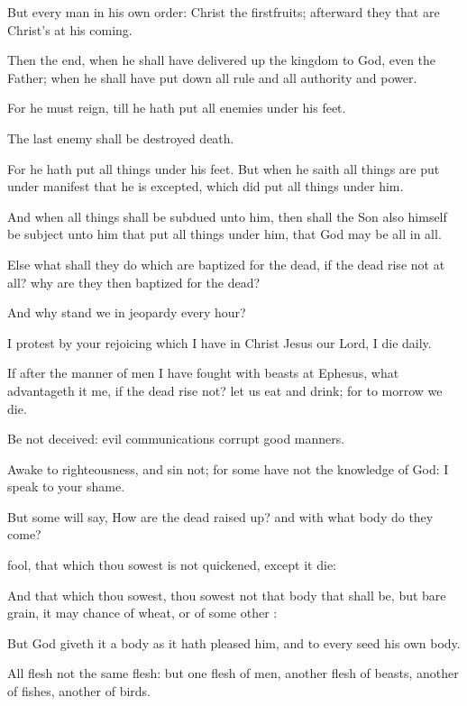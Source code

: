 {But every
man
in his
own
order:
Christ the
firstfruits;
afterward they that
are
Christ’s
at
his
coming.

Then
{} the
end,
when he shall have delivered
up the
kingdom to
God,
even the
Father;
when he shall have put
down
all
rule
and
all
authority
and
power.

For
he
must
reign,
till
he hath
put
all
enemies
under
his
feet.

The
last
enemy
{} shall be
destroyed
{}
death.

For he hath
put all
things
under
his
feet.
But
when he
saith all
things are put
under
{}
manifest
that he is
excepted,
which did
put all
things
under
him.

And
when all
things shall be
subdued unto
him,
then
shall the
Son
also
himself be
subject unto
him that
put all
things under
him,
that
God may
be
all
in
all.

Else
what shall they
do
which are
baptized
for the
dead,
if the
dead
rise
not at
all?
why are
they
then
baptized
for the
dead?

And
why
stand
we in
jeopardy
every
hour?

I protest
by
your
rejoicing
which I
have
in
Christ
Jesus
our
Lord, I
die
daily.

If after the
manner of
men I have fought with
beasts
at
Ephesus,
what advantageth
it
me,
if the
dead
rise
not? let us
eat
and
drink;
for to
morrow we
die.

Be
not
deceived:
evil
communications
corrupt
good
manners.

Awake to
righteousness,
and
sin
not;
for
some
have not the
knowledge of
God: I
speak
{}
to
your
shame.


\par }{\PP {}But
some
{} will
say,
How
are the
dead raised
up?
and with
what
body do they
come?

fool, that
which
thou
sowest
is
not
quickened,
except it
die:

And
that
which thou
sowest, thou
sowest
not
that
body
that shall
be,
but
bare
grain, it may
chance of
wheat,
or of
some
other
{}:

But
God
giveth
it a
body
as it hath pleased
him,
and to
every
seed his
own
body.

All
flesh
{}
not the
same
flesh:
but
{}
one
{}
flesh of
men,
another
flesh of
beasts,
another of
fishes,
{}
another of
birds.

}
